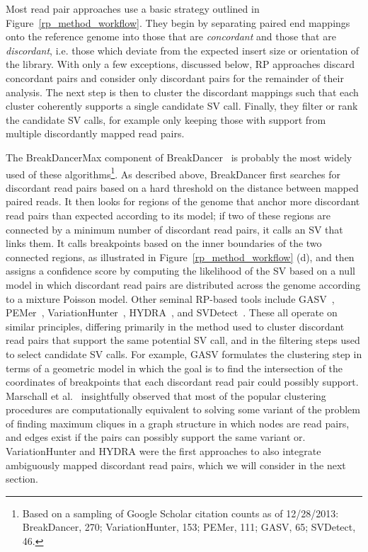 Most read pair approaches use a basic strategy outlined in Figure~\ref{rp_method_workflow}. They begin by separating paired end mappings onto the reference genome into those that are \emph{concordant} and those that are \emph{discordant}, i.e. those which deviate from the expected insert size or orientation of the library. With only a few exceptions, discussed below, RP approaches discard concordant pairs and consider only discordant pairs for the remainder of their analysis. The next step is then to cluster the discordant mappings such that each cluster coherently supports a single candidate SV call. Finally, they filter or rank the candidate SV calls, for example only keeping those with support from multiple discordantly mapped read pairs. 

The BreakDancerMax component of BreakDancer~\cite{Chen:2009p3} is probably the most widely used of these algorithms\footnote{Based on a sampling of Google Scholar citation counts as of 12/28/2013: BreakDancer, 270; VariationHunter, 153; PEMer, 111; GASV, 65; SVDetect, 46.}. As described above, BreakDancer first searches for discordant read pairs based on a hard threshold on the distance between mapped paired reads. It then looks for regions of the genome that anchor more discordant read pairs than expected according to its model; if two of these regions are connected by a minimum number of discordant read pairs, it calls an SV that links them. It calls breakpoints based on the inner boundaries of the two connected regions, as illustrated in Figure~\ref{rp_method_workflow} (d), and then assigns a confidence score by computing the likelihood of the SV based on a null model in which discordant read pairs are distributed across the genome according to a mixture Poisson model. Other seminal RP-based tools include GASV~\cite{Sindi:2009gu}, PEMer~\cite{Korbel:2009dy}, VariationHunter~\cite{Hormozdiari:2009p284}, HYDRA~\cite{Quinlan:2010gf}, and SVDetect~\cite{Zeitouni:2010p8}. These all operate on similar principles, differing primarily in the method used to cluster discordant read pairs that support the same potential SV call, and in the filtering steps used to select candidate SV calls. For example, GASV formulates the clustering step in terms of a geometric model in which the goal is to find the intersection of the coordinates of breakpoints that each discordant read pair could possibly support. Marschall et al.~\cite{Marschall:2012ek} insightfully observed that most of the popular clustering procedures are computationally equivalent to solving some variant of the problem of finding maximum cliques in a graph structure in which nodes are read pairs, and edges exist if the pairs can possibly support the same variant or. VariationHunter and HYDRA were the first approaches to also integrate ambiguously mapped discordant read pairs, which we will consider in the next section.

